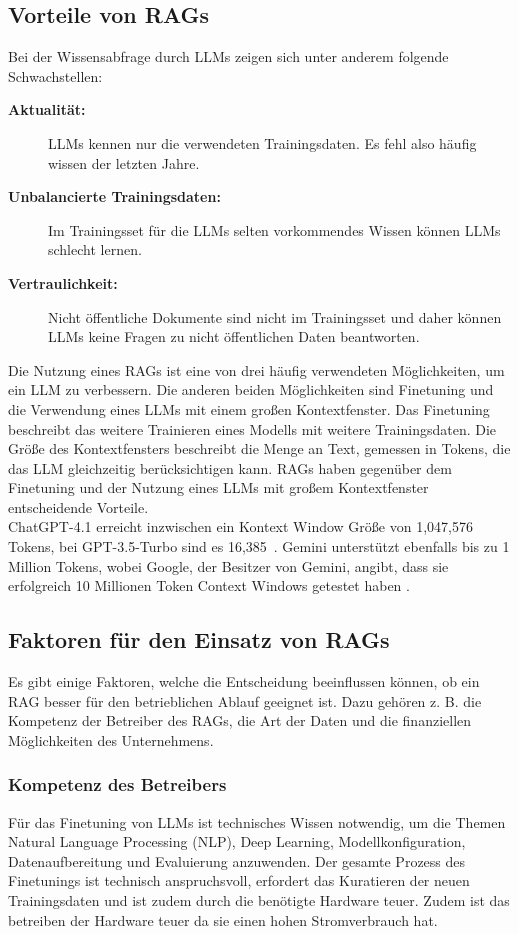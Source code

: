 \subsection{Vorteile von RAGs}
Bei der Wissensabfrage durch LLMs zeigen sich unter anderem folgende Schwachstellen:
\begin{description}
    \item [\textbf{Aktualität:}] LLMs kennen nur die verwendeten Trainingsdaten. Es fehl also häufig wissen der letzten Jahre.
    \item [\textbf{Unbalancierte Trainingsdaten:}] Im Trainingsset für die LLMs selten vorkommendes Wissen können LLMs schlecht lernen. \cite{gao2023rtre,2022arXiv221108411K}
    \item [\textbf{Vertraulichkeit:}]Nicht öffentliche Dokumente sind nicht im Trainingsset und daher können LLMs keine Fragen zu nicht öffentlichen Daten beantworten.
\end{description}

Die Nutzung eines RAGs ist eine von drei häufig verwendeten Möglichkeiten, um ein LLM zu verbessern.
Die anderen beiden Möglichkeiten sind Finetuning und die Verwendung eines LLMs mit einem großen Kontextfenster.
Das Finetuning beschreibt das weitere Trainieren eines Modells mit weitere Trainingsdaten.
Die Größe des Kontextfensters beschreibt die Menge an Text, gemessen in Tokens, die das LLM gleichzeitig berücksichtigen kann.
RAGs haben gegenüber dem Finetuning und der Nutzung eines LLMs mit großem Kontextfenster entscheidende Vorteile.\\
ChatGPT-4.1 erreicht inzwischen ein Kontext Window Größe von 1,047,576 Tokens, bei GPT-3.5-Turbo sind es 16,385~\cite{openai_gpt_4_vision}.
Gemini unterstützt ebenfalls bis zu 1 Million Tokens, wobei Google, der Besitzer von Gemini, angibt, dass sie erfolgreich 10 Millionen Token Context Windows getestet haben \cite{google_gemini_next_generation_model}.

\subsection{Faktoren für den Einsatz von RAGs}
Es gibt einige Faktoren, welche die Entscheidung beeinflussen können, ob ein RAG besser für den betrieblichen Ablauf geeignet ist.
Dazu gehören z. B. die Kompetenz der Betreiber des RAGs, die Art der Daten und die finanziellen Möglichkeiten des Unternehmens.


\subsubsection{Kompetenz des Betreibers}
Für das Finetuning von LLMs ist technisches Wissen notwendig, um die Themen Natural Language Processing (NLP), Deep Learning, Modellkonfiguration, Datenaufbereitung und Evaluierung anzuwenden.
Der gesamte Prozess des Finetunings ist technisch anspruchsvoll, erfordert das Kuratieren der neuen Trainingsdaten und ist zudem durch die benötigte Hardware teuer.
Zudem ist das betreiben der Hardware teuer da sie einen hohen Stromverbrauch hat.

